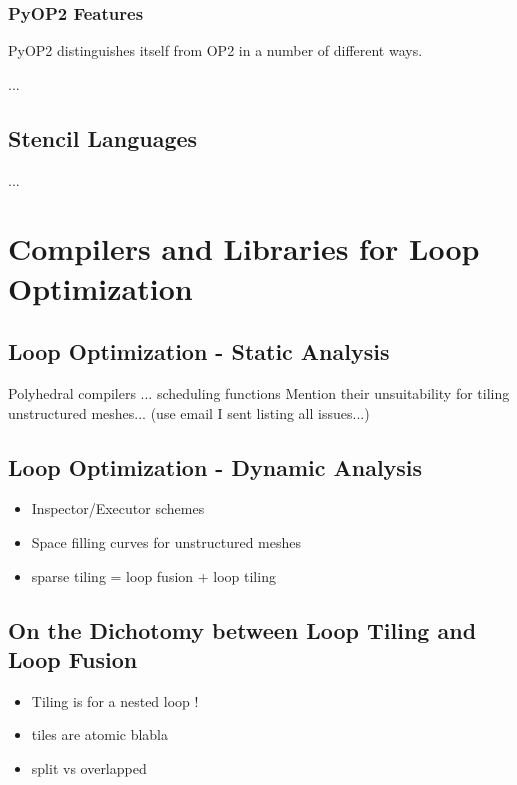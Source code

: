 \subsubsection{PyOP2 Features}
PyOP2 distinguishes itself from OP2 in a number of different ways. 

...

\subsection{Stencil Languages}
...


\section{Compilers and Libraries for Loop Optimization}
\label{sec:bkg:codeopt}


\subsection{Loop Optimization - Static Analysis}
\label{sec:bkg:poly}
Polyhedral compilers ...
scheduling functions
Mention their unsuitability for tiling unstructured meshes... (use email I sent listing all issues...)




\subsection{Loop Optimization - Dynamic Analysis}
\label{sec:bkg:ie}
\begin{itemize}
\item Inspector/Executor schemes
\item Space filling curves for unstructured meshes
\item sparse tiling = loop fusion + loop tiling
\end{itemize}


\subsection{On the Dichotomy between Loop Tiling and Loop Fusion}
\label{sec:bkg:tiling}

\begin{itemize}
\item Tiling is for a nested loop ! 
\item tiles are atomic blabla
\item split vs overlapped
\end{itemize}


